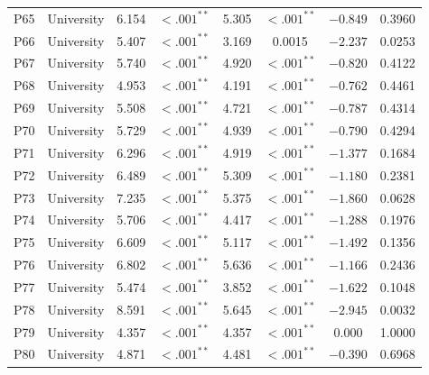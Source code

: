 \begin{longtable}{llcccccc}
P65 & University & 6.154 & $<.001^{**}$ & 5.305 & $<.001^{**}$ & $-0.849$ & 0.3960 \\
P66 & University & 5.407 & $<.001^{**}$ & 3.169 & 0.0015 & $-2.237$ & 0.0253 \\
P67 & University & 5.740 & $<.001^{**}$ & 4.920 & $<.001^{**}$ & $-0.820$ & 0.4122 \\
P68 & University & 4.953 & $<.001^{**}$ & 4.191 & $<.001^{**}$ & $-0.762$ & 0.4461 \\
P69 & University & 5.508 & $<.001^{**}$ & 4.721 & $<.001^{**}$ & $-0.787$ & 0.4314 \\
P70 & University & 5.729 & $<.001^{**}$ & 4.939 & $<.001^{**}$ & $-0.790$ & 0.4294 \\
P71 & University & 6.296 & $<.001^{**}$ & 4.919 & $<.001^{**}$ & $-1.377$ & 0.1684 \\
P72 & University & 6.489 & $<.001^{**}$ & 5.309 & $<.001^{**}$ & $-1.180$ & 0.2381 \\
P73 & University & 7.235 & $<.001^{**}$ & 5.375 & $<.001^{**}$ & $-1.860$ & 0.0628 \\
P74 & University & 5.706 & $<.001^{**}$ & 4.417 & $<.001^{**}$ & $-1.288$ & 0.1976 \\
P75 & University & 6.609 & $<.001^{**}$ & 5.117 & $<.001^{**}$ & $-1.492$ & 0.1356 \\
P76 & University & 6.802 & $<.001^{**}$ & 5.636 & $<.001^{**}$ & $-1.166$ & 0.2436 \\
P77 & University & 5.474 & $<.001^{**}$ & 3.852 & $<.001^{**}$ & $-1.622$ & 0.1048 \\
P78 & University & 8.591 & $<.001^{**}$ & 5.645 & $<.001^{**}$ & $-2.945$ & 0.0032 \\
P79 & University & 4.357 & $<.001^{**}$ & 4.357 & $<.001^{**}$ & 0.000 & 1.0000 \\
P80 & University & 4.871 & $<.001^{**}$ & 4.481 & $<.001^{**}$ & $-0.390$ & 0.6968 \\
\end{longtable}
\endgroup
